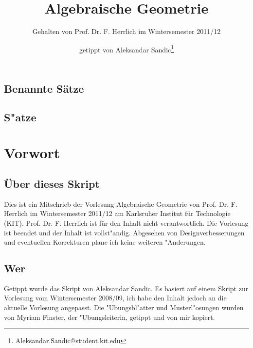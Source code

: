 \documentclass[a4paper, 12pt, numbers=noendperiod, chapterprefix=true]{scrbook}
\title{Algebraische Geometrie}
\subtitle{Gehalten von Prof. Dr. F. Herrlich im Wintersemester 2011/12}
\author{getippt von Aleksandar Sandic\thanks{Aleksandar.Sandic@student.kit.edu}}
\theoremstyle{break}
\theoremstyle{nonumberbreak}
\theoremstyle{nonumberplain}
\newcommand{\quot}[1]{\textrm{\glqq}{#1}\textrm{\grqq}}
\begin{document}
\maketitle

\setlength\parskip{0.6pt}
\tableofcontents

\section*{Benannte S\"atze}


\section*{S"atze}


\setlength\parskip{\smallskipamount}



\chapter{Vorwort}
\setcounter{secnumdepth}{2}
\section*{\"Uber dieses Skript}
Dies ist ein Mitschrieb der Vorlesung \quot{Algebraische Geometrie} von Prof. Dr. F. Herrlich im Wintersemester 2011/12 am Karlsruher Institut f\"ur Technologie (KIT). Prof. Dr. F. Herrlich ist f\"ur  den Inhalt nicht verantwortlich. Die Vorlesung ist beendet und der Inhalt ist vollst"andig. Abgesehen von Designverbesserungen und eventuellen Korrekturen plane ich keine weiteren "Anderungen.

\section*{Wer}
Getippt wurde das Skript von Aleksandar Sandic. Es basiert auf einem Skript zur Vorlesung vom Wintersemester 2008/09, ich habe den Inhalt jedoch an die aktuelle Vorlesung angepasst. Die "Ubungsbl"atter und Musterl"osungen wurden von Myriam Finster, der "Ubungsleiterin, getippt und von mir kopiert.
\end{document}
